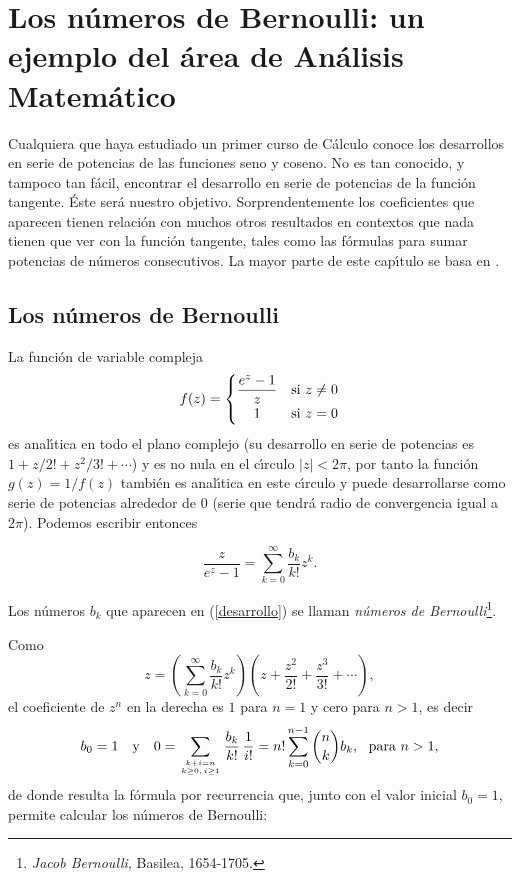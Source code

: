 \chapter[Los n\'umeros de Bernoulli: un ejemplo del \'area de An\'alisis]{Los n\'umeros de Bernoulli: un ejemplo del \'area de An\'alisis Matem\'atico}
\label{CapituloBernoulli}

Cualquiera que haya estudiado un primer curso de C\'alculo conoce los desarrollos en serie de potencias de las funciones seno y coseno. No es tan conocido, y tampoco tan f\'acil, encontrar el desarrollo en serie de potencias de la funci\'on tangente. \'Este ser\'a nuestro objetivo. Sorprendentemente los coeficientes que aparecen tienen relaci\'on con muchos otros resultados en contextos que nada tienen que ver con la funci\'on tangente, tales como las f\'ormulas para sumar potencias de n\'umeros consecutivos. La mayor parte de este cap\'\i tulo se basa en \cite[Cap\'\i tulo 27]{Spivak}.

\section{Los n\'umeros de Bernoulli}

La funci\'on de variable compleja $$f(z)=\begin{cases} \displaystyle\frac{e^z-1}{z} & \text{si  } z\not=0\\
\hfill 1\hfill  & \text{si } z=0\end{cases}$$
es anal\'\i tica en todo el plano complejo (su desarrollo en serie de potencias es $1+z/2!+z^2/3!+\cdots$) y es no nula en el c\'\i rculo $|z|<2\pi$, por tanto la funci\'on $g(z)=1/f(z)$ tambi\'en es anal\'\i tica en este c\'\i rculo y puede desarrollarse como serie de potencias alrededor de $0$ (serie que tendr\'a radio de convergencia igual a $2\pi$). Podemos escribir entonces

\begin{equation}
\label{desarrollo}
\frac{z}{e^z-1}=\sum_{k=0}^\infty \frac{b_k}{k!}z^k.
\end{equation}

\begin{definicion} Los n\'umeros $b_k$ que aparecen en (\ref{desarrollo}) se llaman \emph{n\'umeros de Bernoulli}\footnote{\emph{Jacob Bernoulli}, Basilea, 1654-1705.}.
\end{definicion}

Como
$$z=\left(\sum_{k=0}^\infty\frac{b_k}{k!}z^k\right)\left(z+\frac{z^2}{2!}+\frac{z^3}{3!}+\cdots \right),$$
el coeficiente de $z^n$ en la derecha es $1$ para $n=1$ y cero para $n>1$,  es decir
$$b_0=1\quad \text{y}\quad  0=\sum_{k+i=n \atop k\geq 0,\,i\geq 1}\frac{b_k}{k!}\,\frac{1}{i!}=n!\sum_{k=0}^{n-1}{n\choose k}b_k,\  \text{ para } n>1,$$ de donde resulta la f\'ormula por recurrencia que, junto con el valor inicial $b_0=1$, permite  calcular los n\'umeros de Bernoulli:

